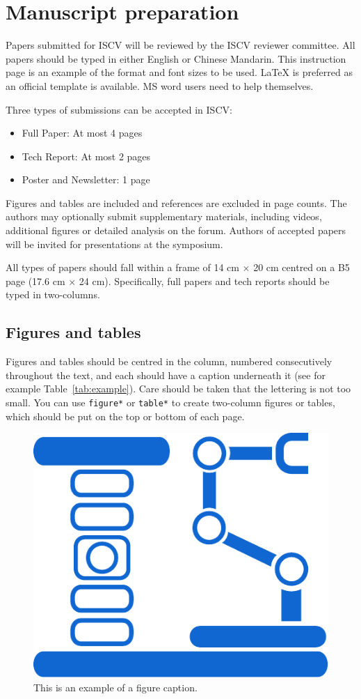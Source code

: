 \documentclass[10pt]{article}
\begin{document}
\section{Manuscript preparation}
Papers submitted for ISCV will be reviewed by the ISCV reviewer committee. All papers should be typed in either English or Chinese Mandarin.
This instruction page is an example of the format and font sizes to be used. \LaTeX{} is preferred as an official template is available. 
MS word users need to help themselves. 

Three types of submissions can be accepted in ISCV:
\begin{itemize}
    \item Full Paper: At most 4 pages
    \item Tech Report: At most 2 pages
    \item Poster and Newsletter: 1 page
\end{itemize}
Figures and tables are included and references
are excluded in page counts.  The authors may optionally submit supplementary materials, including videos, additional 
figures or detailed analysis on the forum. Authors of accepted papers will be invited for presentations at the symposium. 

All types of papers should fall within a frame of {14 cm $\times$ 20 cm} centred on a B5 page (17.6 cm $\times$ 24 cm). 
Specifically, full papers and tech reports should be typed in two-columns. 

\subsection{Figures and tables}
Figures and tables should be centred in the column, numbered
consecutively throughout the text, and each should have a
caption underneath it (see for example Table~\ref{tab:example}). 
Care should be taken that the lettering is not too small. 
You can use \texttt{figure*} or \texttt{table*} to create two-column figures 
or tables, which should be put on the top or bottom of each page.

\begin{figure}[h]
\centering
\includegraphics[width=.5\linewidth]{figs/fig1.pdf}
\caption{This is an example of a figure caption.} 
\label{fig:example}
\end{figure}
\end{document}

